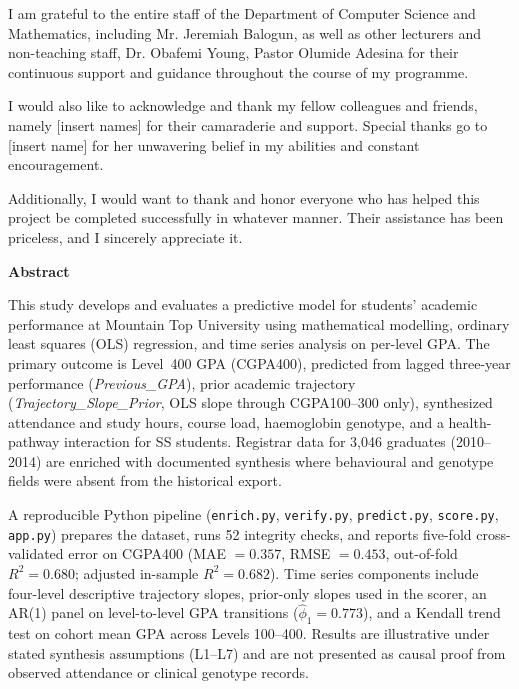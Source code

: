 \documentclass[12pt]{report}
\begin{document}
	\noindent I am grateful to the entire staff of the Department of Computer Science and Mathematics, including Mr. Jeremiah Balogun, as well as other lecturers and non-teaching staff, Dr. Obafemi Young, Pastor Olumide Adesina for their continuous support and guidance throughout the course of my programme.
	
	\noindent I would also like to acknowledge and thank my fellow colleagues and friends, namely [insert names] for their camaraderie and support. Special thanks go to [insert name] for her unwavering belief in my abilities and constant encouragement.
	
	\noindent Additionally, I would want to thank and honor everyone who has helped this project be completed successfully in whatever manner. Their assistance has been priceless, and I sincerely appreciate it.

	\newpage
	\begin{center}
		{\Large{\bf Abstract}}
	\end{center}
	
	\noindent This study develops and evaluates a predictive model for students' academic performance at Mountain Top University using mathematical modelling, ordinary least squares (OLS) regression, and time series analysis on per-level GPA. The primary outcome is Level~400 GPA (CGPA400), predicted from lagged three-year performance (\textit{Previous\_GPA}), prior academic trajectory (\textit{Trajectory\_Slope\_Prior}, OLS slope through CGPA100--300 only), synthesized attendance and study hours, course load, haemoglobin genotype, and a health-pathway interaction for SS students. Registrar data for 3,046 graduates (2010--2014) are enriched with documented synthesis where behavioural and genotype fields were absent from the historical export.
	
	A reproducible Python pipeline (\texttt{enrich.py}, \texttt{verify.py}, \texttt{predict.py}, \texttt{score.py}, \texttt{app.py}) prepares the dataset, runs 52 integrity checks, and reports five-fold cross-validated error on CGPA400 (MAE $= 0.357$, RMSE $= 0.453$, out-of-fold $R^2 = 0.680$; adjusted in-sample $R^2 = 0.682$). Time series components include four-level descriptive trajectory slopes, prior-only slopes used in the scorer, an AR(1) panel on level-to-level GPA transitions ($\hat{\phi}_1 = 0.773$), and a Kendall trend test on cohort mean GPA across Levels 100--400. Results are illustrative under stated synthesis assumptions (L1--L7) and are not presented as causal proof from observed attendance or clinical genotype records.
	
\end{document}
